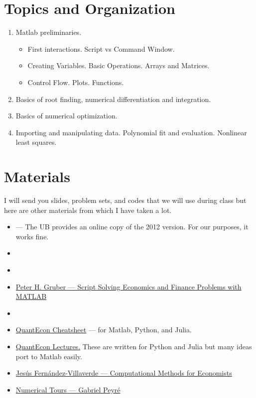 \documentclass[a4paper,12pt]{article}
\begin{document}
\section{Topics and Organization}

\begin{enumerate}[label={\textbf{Session \arabic*}}]
    \item Matlab preliminaries. 
    \begin{itemize}
        \item First interactions. Script vs Command Window.
        \item Creating Variables. Basic Operations. Arrays and Matrices.
        \item Control Flow. Plots. Functions.
    \end{itemize}
    \item Basics of root finding, numerical differentiation and integration.
    \item Basics of numerical optimization.
    \item Importing and manipulating data. Polynomial fit and evaluation. Nonlinear least squares.
\end{enumerate}

\section{Materials}

I will send you slides, problem sets, and codes that we will use during class but here are other materials from which I have taken a lot.

\begin{itemize}
    \item \href{https://www.elsevier.com/books/matlab/attaway/978-0-323-91750-6}{} --- The UB provides an online copy of the 2012 version. For our purposes, it works fine.
    \item \href{https://mitpress.mit.edu/books/numerical-methods-economics}{}
    \item \href{https://mitpress.mit.edu/books/algorithms-optimization}{}
    \item \href{https://people.lu.usi.ch/gruberp/MatlabMasterScript.pdf}{Peter H. Gruber --- Script Solving Economics and Finance Problems with MATLAB}
    \item \href{https://link-springer-com.sire.ub.edu/book/10.1007/978-0-387-40065-5}{}
    \item \href{https://cheatsheets.quantecon.org/index.html}{QuantEcon Cheatsheet} ---  for Matlab, Python, and Julia.
    \item \href{https://quantecon.org/lectures/}{QuantEcon Lectures.} These are written for Python and Julia but many ideas port to Matlab easily.
    \item \href{https://www.sas.upenn.edu/~jesusfv/teaching.html}{Jes\'us Fern\'andez-Villaverde --- Computational Methods for Economists}
    \item \href{http://www.numerical-tours.com/matlab/}{Numerical Tours --- Gabriel Peyr\'e}
\end{itemize}
\end{document}
